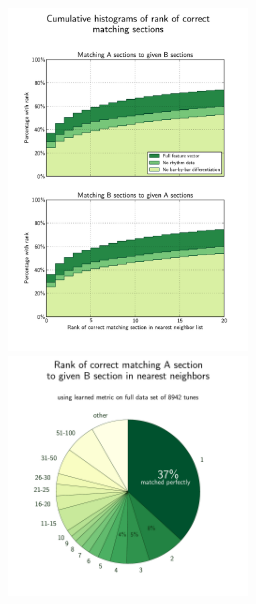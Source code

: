 \documentclass{article} %
\begin{document}
\begin{figure}
\begin{center}
\includegraphics[width=2.5in]{../trial_data_logs/hists.pdf}
\includegraphics[width=2.5in]{../trial_data_logs/pie.pdf}
\end{center}
\end{figure}
\end{document}
